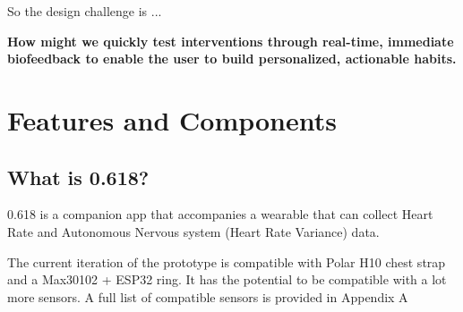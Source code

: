 \documentclass[
	fontsize=15pt,
	twoside=false,
	secnumdepth=2
]{kaobook}
\begin{document}
So the design challenge is ...

\newpage

\clearpage
\thispagestyle{empty}
\fullwidthpage %

\vspace*{\fill}
\begin{center}
{\Huge\bfseries\color{RoyalPurple}
How might we quickly test interventions through real-time, immediate biofeedback to enable the user to build personalized, actionable habits.\par
}
\end{center}
\vspace*{\fill}

\clearpage
{} %

\newpage

\section{Features and Components}

\subsection{What is 0.618?}
0.618 is a companion app that accompanies a wearable that can collect Heart Rate and Autonomous Nervous system (Heart Rate Variance) data.

The current iteration of the prototype is compatible with Polar H10 chest strap and a Max30102 + ESP32 ring. It has the potential to be compatible with a lot more sensors. A full list of compatible sensors is provided in Appendix A

\begin{marginfigure}
\centering
{}
\caption{Sensor + App leading to Visuals and Actions.}
\end{marginfigure}
\end{document}

